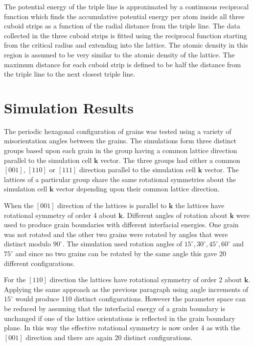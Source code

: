 \documentclass[12pt,a4paper,openany]{report}
\begin{document}
The potential energy of the triple line is approximated by a continuous reciprocal function which finds the accumulative potential energy per atom inside all three cuboid strips as a function of the radial distance from the triple line. The data collected in the three cuboid strips is fitted using the reciprocal function starting from the critical radius and extending into the lattice. The atomic density in this region is assumed to be very similar to the atomic density of the lattice. The maximum distance for each cuboid strip is defined to be half the distance from the triple line to the next closest triple line.

\chapter{Simulation Results} \label{ch:SimulationResults}

The periodic hexagonal configuration of grains was tested using a variety of misorientation angles between the grains.  The simulations form three distinct groups based upon each grain in the group having a common lattice direction parallel to the simulation cell $\mathbf{k}$ vector. The three groups had either a common $[0 0 1]$, $[1 1 0]$ or $[1 1 1]$ direction parallel to the simulation cell $\mathbf{k}$ vector. The lattices of a particular group share the same rotational symmetries about the simulation cell $\mathbf{k}$ vector depending upon their common lattice direction.

When the $[0 0 1]$ direction of the lattices is parallel to $\mathbf{k}$ the lattices have rotational symmetry of order 4 about $\mathbf{k}$.  Different angles of rotation about $\mathbf{k}$ were used to produce grain boundaries with different interfacial energies. One grain was not rotated and the other two grains were rotated by angles that were distinct modulo $90^{\circ}$. The simulation used rotation angles of $15^{\circ},30^{\circ},45^{\circ},60^{\circ}$ and $75^{\circ}$ and since no two grains can be rotated by the same angle this gave 20 different configurations.

For the $[1 1 0]$ direction the lattices have rotational symmetry of order 2 about $\mathbf{k}$. Applying the same approach as the previous paragraph using angle increments of $15^{\circ}$ would produce 110 distinct configurations. However the parameter space can be reduced by assuming that the interfacial energy of a grain boundary is unchanged if one of the lattice orientations is reflected in the grain boundary plane. In this way the effective rotational symmetry is now order 4 as with the $[0 0 1]$ direction and there are again 20 distinct configurations.  
\end{document}
